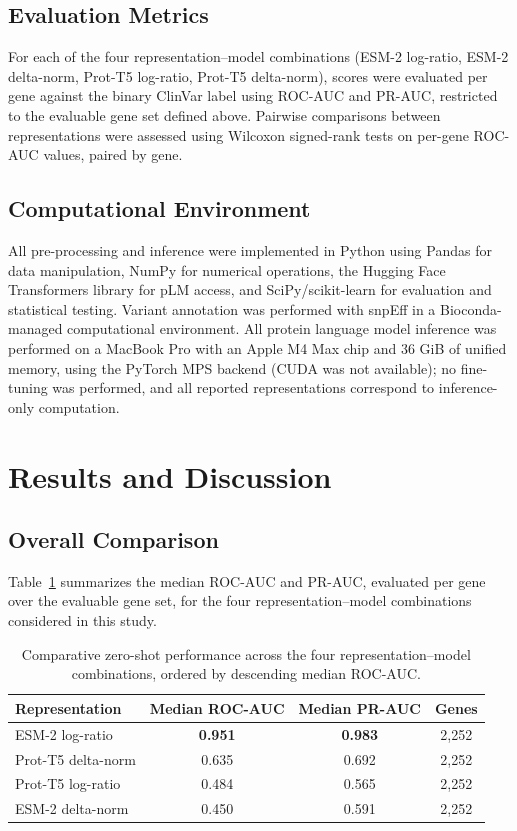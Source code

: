\documentclass[12pt]{article}
\begin{document}
\subsection{Evaluation Metrics}

For each of the four representation--model combinations (ESM-2 log-ratio, ESM-2 delta-norm, Prot-T5 log-ratio, Prot-T5 delta-norm), scores were evaluated per gene against the binary ClinVar label using ROC-AUC and PR-AUC, restricted to the evaluable gene set defined above. Pairwise comparisons between representations were assessed using Wilcoxon signed-rank tests on per-gene ROC-AUC values, paired by gene.

\subsection{Computational Environment}

All pre-processing and inference were implemented in Python using Pandas for data manipulation, NumPy for numerical operations, the Hugging Face Transformers library for pLM access, and SciPy/scikit-learn for evaluation and statistical testing. Variant annotation was performed with snpEff in a Bioconda-managed computational environment. All protein language model inference was performed on a MacBook Pro with an Apple M4 Max chip and 36 GiB of unified memory, using the PyTorch MPS backend (CUDA was not available); no fine-tuning was performed, and all reported representations correspond to inference-only computation.

\section{Results and Discussion}

\subsection{Overall Comparison}
\label{sec:overall}

Table~\ref{tab:comparative} summarizes the median ROC-AUC and PR-AUC, evaluated per gene over the evaluable gene set, for the four representation--model combinations considered in this study.

\begin{table}[ht]
\centering
\caption{Comparative zero-shot performance across the four representation--model combinations, ordered by descending median ROC-AUC.}
\label{tab:comparative}
\begin{tabular}{lccc}
\hline
\textbf{Representation} & \textbf{Median ROC-AUC} & \textbf{Median PR-AUC} & \textbf{Genes} \\
\hline
ESM-2 log-ratio     & \textbf{0.951} & \textbf{0.983} & 2,252 \\
Prot-T5 delta-norm  & 0.635          & 0.692          & 2,252 \\
Prot-T5 log-ratio   & 0.484          & 0.565          & 2,252 \\
ESM-2 delta-norm    & 0.450          & 0.591          & 2,252 \\
\hline
\end{tabular}
\end{table}
\end{document}

